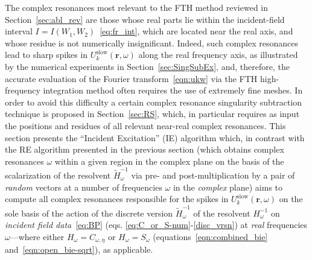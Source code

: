 \documentclass[11pt]{article}
\theoremstyle{plain}
\theoremstyle{remark}
\def \br{\mathbf{r}}
\begin{document}
The complex resonances most relevant to the FTH method reviewed in
Section~\ref{sec:abl_rev} are those whose real parts lie within the
incident-field interval $I = I(W_1,W_2)$~\eqref{eq:fr_int}, which are
located near the real axis, and whose residue is not numerically
insignificant. Indeed, such complex resonances lead to sharp spikes in
$U_k^\mathrm{slow}(\br,\omega)$ along the real frequency axis, as
illustrated by the numerical experiments in
Section~\ref{sec:SingSubEx}, and, therefore, the accurate evaluation
of the Fourier transform~\eqref{eqn:ukw} via the FTH high-frequency
integration method often requires the use of extremely fine meshes. In
order to avoid this difficulty a certain complex resonance singularity
subtraction technique is proposed in Section~\ref{sec:RS}, which, in
particular requires as input the positions and residues of all
relevant near-real complex resonances. This section presents the
``Incident Excitation'' (IE) algorithm which, in contrast with the RE
algorithm presented in the previous section (which obtains complex
resonances $\omega$ within a given region in the complex plane on the
basis of the scalarization of the resolvent
$\widetilde{H}_\omega^{-1}$ via pre- and post-multiplication by a pair
of {\em random} vectors at a number of frequencies $\omega$ in the
{\em complex} plane) aims to compute all complex resonances
responsible for the spikes in $U_k^\mathrm{slow}(\br,\omega)$ on the
sole basis of the action of the discrete version
$\widetilde{H}_\omega^{-1}$ of the resolvent $H_\omega^{-1}$ on {\em
  incident field data}~\eqref{eq:BP}
(eqs. \eqref{eq:C_or_S-num}-\eqref{disc_vrsn}) at {\em real}
frequencies $\omega$---where either $H_\omega = C_{\omega,\eta}$ or
$H_\omega = S_\omega$ (equations~\eqref{eqn:combined_bie}
and~\eqref{eqn:open_bie-sqrt}), as applicable.
\end{document}
